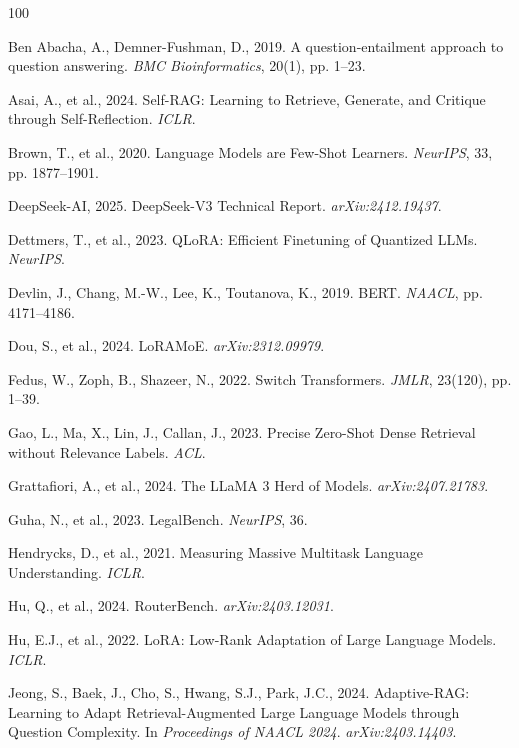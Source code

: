 \documentclass[a4paper,fleql]{cas-sc}
\begin{document}
\begin{thebibliography}{100}

Ben Abacha, A., Demner-Fushman, D., 2019. A question-entailment approach to question answering. \textit{BMC Bioinformatics}, 20(1), pp. 1--23.

Asai, A., et al., 2024. Self-RAG: Learning to Retrieve, Generate, and Critique through Self-Reflection. \textit{ICLR}.

Brown, T., et al., 2020. Language Models are Few-Shot Learners. \textit{NeurIPS}, 33, pp. 1877--1901.


DeepSeek-AI, 2025. DeepSeek-V3 Technical Report. \textit{arXiv:2412.19437}.

Dettmers, T., et al., 2023. QLoRA: Efficient Finetuning of Quantized LLMs. \textit{NeurIPS}.

Devlin, J., Chang, M.-W., Lee, K., Toutanova, K., 2019. BERT. \textit{NAACL}, pp. 4171--4186.

Dou, S., et al., 2024. LoRAMoE. \textit{arXiv:2312.09979}.

Fedus, W., Zoph, B., Shazeer, N., 2022. Switch Transformers. \textit{JMLR}, 23(120), pp. 1--39.

Gao, L., Ma, X., Lin, J., Callan, J., 2023. Precise Zero-Shot Dense Retrieval without Relevance Labels. \textit{ACL}.

Grattafiori, A., et al., 2024. The LLaMA 3 Herd of Models. \textit{arXiv:2407.21783}.

Guha, N., et al., 2023. LegalBench. \textit{NeurIPS}, 36.

Hendrycks, D., et al., 2021. Measuring Massive Multitask Language Understanding. \textit{ICLR}.

Hu, Q., et al., 2024. RouterBench. \textit{arXiv:2403.12031}.

Hu, E.J., et al., 2022. LoRA: Low-Rank Adaptation of Large Language Models. \textit{ICLR}.


Jeong, S., Baek, J., Cho, S., Hwang, S.J., Park, J.C., 2024.
\newblock Adaptive-RAG: Learning to Adapt Retrieval-Augmented Large Language Models through Question Complexity.
\newblock In \textit{Proceedings of NAACL 2024}. \textit{arXiv:2403.14403}.


\end{thebibliography}
\end{document}
